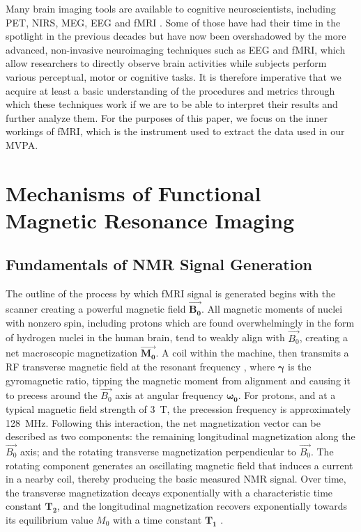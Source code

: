Many brain imaging tools are available to cognitive neuroscientists, including \gls{PET}, \gls{NIRS}, \gls{MEG}, \gls{EEG} and \gls{fMRI} \cite{Xue2010}. Some of those have had their time in the spotlight in the previous decades but have now been overshadowed by the more advanced, non-invasive neuroimaging techniques such as \gls{EEG} and \gls{fMRI}, which allow researchers to directly observe brain activities while subjects perform various perceptual, motor or cognitive tasks. It is therefore imperative that we acquire at least a basic understanding of the procedures and metrics through which these techniques work if we are to be able to interpret their results and further analyze them. For the purposes of this paper, we focus on the inner workings of \gls{fMRI}, which is the instrument used to extract the data used in our \gls{MVPA}.

\section{Mechanisms of Functional Magnetic Resonance Imaging}

\subsection{Fundamentals of NMR Signal Generation}

The outline of the process by which \gls{fMRI} signal is generated begins with the scanner creating a powerful magnetic field  \( \vec{\boldsymbol{B_0}} \). All magnetic moments of nuclei with nonzero spin, including protons which are found overwhelmingly in the form of hydrogen nuclei in the human brain, tend to weakly align with \( \vec{B_0} \), creating a net macroscopic magnetization \( \vec{\boldsymbol{M_0}} \). A coil within the machine, then transmits a \gls{RF} transverse magnetic field at the resonant frequency , where \( \boldsymbol{\gamma} \) is the \gls{gyromagnetic ratio}, tipping the magnetic moment from alignment and causing it to precess around the \( \vec{B_0} \) axis at angular frequency \( \boldsymbol{\omega_0} \). For protons,  and at a typical magnetic field strength of \SI{3}{\tesla}, the precession frequency  is approximately \SI{128}{\mega\hertz}. Following this interaction, the net magnetization vector can be described as two components: the remaining longitudinal magnetization along the \( \vec{B_0} \) axis; and the rotating transverse magnetization perpendicular to \( \vec{B_0} \). The rotating component generates an oscillating magnetic field that induces a current in a nearby coil, thereby producing the basic measured \gls{NMR} signal. Over time, the transverse magnetization decays exponentially with a characteristic time constant \( \boldsymbol{T_2} \), and the longitudinal magnetization recovers exponentially towards its equilibrium value \( M_0 \) with a time constant \( \boldsymbol{T_1} \) \cite{Buxton2013, Suriaga2009}.

